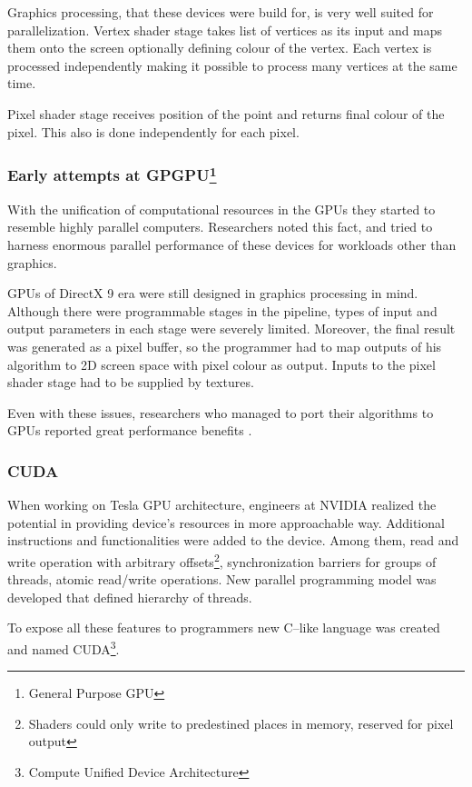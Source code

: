 Graphics processing, that these devices were build for, is very well suited for
parallelization. Vertex shader stage takes list of vertices as its input and
maps them onto the screen optionally defining colour of the vertex. Each
vertex is processed independently making it possible to process many vertices
at the same time.

Pixel shader stage receives position of the point and returns final colour of
the pixel. This also is done independently for each pixel.

\subsubsection[Early attempts at GPGPU]{Early attempts at GPGPU\footnote{General Purpose GPU}}

With the unification of computational resources in the GPUs they started to
resemble highly parallel computers. Researchers noted this fact, and tried to
harness enormous parallel performance of these devices for workloads other than
graphics.

GPUs of DirectX 9 era were still designed in graphics processing in mind.
Although there were programmable stages in the pipeline, types of input and
output parameters in each stage were severely limited. Moreover, the final
result was generated as a pixel buffer, so the programmer had to map outputs of
his algorithm to 2D screen space with pixel colour as output. Inputs to the
pixel shader stage had to be supplied by textures.

Even with these issues, researchers who managed to port their algorithms to
GPUs reported great performance benefits \parencite{gpugems2ch46}.

\subsubsection{CUDA}

When working on Tesla GPU architecture, engineers at NVIDIA realized the
potential in providing device's resources in more approachable way. Additional instructions
and functionalities were added to the device. Among them, read and write
operation with arbitrary offsets\footnote{Shaders could only write to predestined
places in memory, reserved for pixel output}, synchronization barriers for
groups of threads, atomic read/write operations. New parallel programming model
was developed that defined hierarchy of threads.

To expose all these features to programmers new C--like language was
created and named CUDA\footnote{Compute Unified Device Architecture}.

